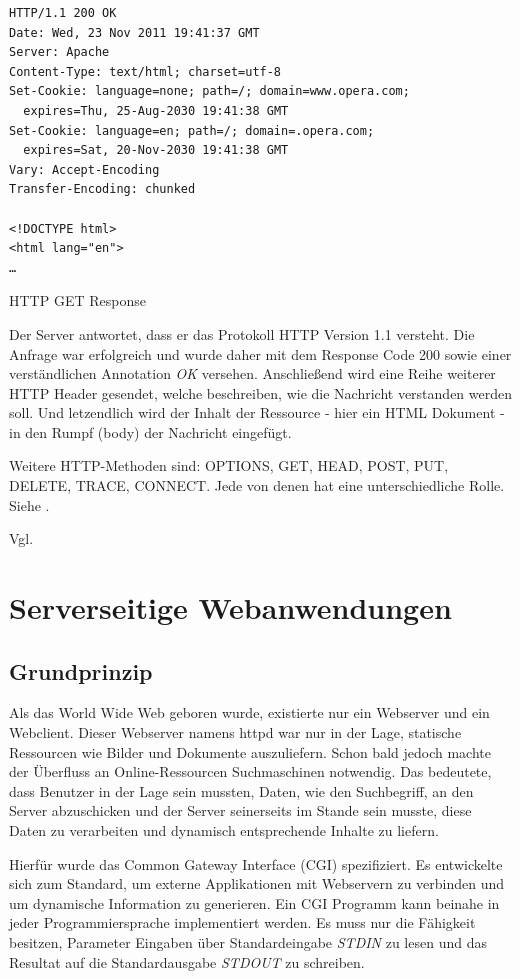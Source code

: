 \begin{listing}[H]
\begin{verbatim}
HTTP/1.1 200 OK
Date: Wed, 23 Nov 2011 19:41:37 GMT
Server: Apache
Content-Type: text/html; charset=utf-8
Set-Cookie: language=none; path=/; domain=www.opera.com;
  expires=Thu, 25-Aug-2030 19:41:38 GMT
Set-Cookie: language=en; path=/; domain=.opera.com;
  expires=Sat, 20-Nov-2030 19:41:38 GMT
Vary: Accept-Encoding
Transfer-Encoding: chunked

<!DOCTYPE html>
<html lang="en">
…
\end{verbatim}
\caption{HTTP GET Response}
\end{listing}

Der Server antwortet, dass er das Protokoll HTTP Version 1.1 versteht. Die Anfrage war erfolgreich und wurde daher mit dem Response Code 200 sowie einer verständlichen Annotation \emph{OK} versehen. Anschließend wird eine Reihe weiterer HTTP Header gesendet, welche beschreiben, wie die Nachricht verstanden werden soll. Und letzendlich wird der Inhalt der Ressource - hier ein HTML Dokument - in den Rumpf (body) der Nachricht eingefügt.

Weitere HTTP-Methoden sind: OPTIONS, GET, HEAD, POST, PUT, DELETE, TRACE, CONNECT.
Jede von denen hat eine unterschiedliche Rolle. Siehe \cite[Kap. 4]{Fielding:2014}.

Vgl. \cite{Dubost:2012}

\section{Serverseitige Webanwendungen}

\subsection{Grundprinzip}

Als das World Wide Web geboren wurde, existierte nur ein Webserver und ein Webclient. Dieser Webserver namens httpd war nur in der Lage, statische Ressourcen wie Bilder und Dokumente auszuliefern. Schon bald jedoch machte der Überfluss an Online-Ressourcen Suchmaschinen notwendig. Das bedeutete, dass Benutzer in der Lage sein mussten, Daten, wie den Suchbegriff, an den Server abzuschicken und der Server seinerseits im Stande sein musste, diese Daten zu verarbeiten und dynamisch entsprechende Inhalte zu liefern.

Hierfür wurde das Common Gateway Interface (CGI) spezifiziert. Es entwickelte sich zum Standard, um externe Applikationen mit Webservern zu verbinden und um dynamische Information zu generieren. Ein CGI Programm kann beinahe in jeder Programmiersprache implementiert werden. Es muss nur die Fähigkeit besitzen, Parameter Eingaben über Standardeingabe \emph{STDIN} zu lesen und das Resultat auf die Standardausgabe  \emph{STDOUT} zu schreiben.

